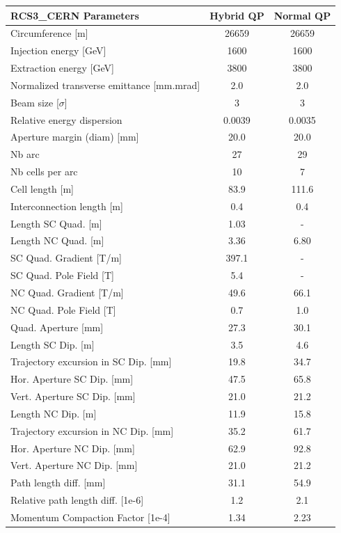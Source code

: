 \begin{tabular}{lcc}
\toprule
RCS3_CERN Parameters & Hybrid QP & Normal QP \\
\midrule
Circumference [m] & 26659 & 26659 \\
Injection energy [GeV] & 1600 & 1600 \\
Extraction energy [GeV] & 3800 & 3800 \\
Normalized transverse emittance [mm.mrad] & 2.0 & 2.0 \\
Beam size [$\sigma$] & 3 & 3 \\
Relative energy dispersion & 0.0039 & 0.0035 \\
Aperture margin (diam) [mm] & 20.0 & 20.0 \\
Nb arc & 27 & 29 \\
Nb cells per arc & 10 & 7 \\
Cell length [m] & 83.9 & 111.6 \\
Interconnection length [m] & 0.4 & 0.4 \\
Length SC Quad. [m] & 1.03 & - \\
Length NC Quad. [m] & 3.36 & 6.80 \\
SC Quad. Gradient [T/m] & 397.1 & - \\
SC Quad. Pole Field [T] & 5.4 & - \\
NC Quad. Gradient [T/m] & 49.6 & 66.1 \\
NC Quad. Pole Field [T] & 0.7 & 1.0 \\
Quad. Aperture [mm] & 27.3 & 30.1 \\
Length SC Dip. [m] & 3.5 & 4.6 \\
Trajectory excursion in SC Dip. [mm] & 19.8 & 34.7 \\
Hor. Aperture SC Dip. [mm] & 47.5 & 65.8 \\
Vert. Aperture SC Dip. [mm] & 21.0 & 21.2 \\
Length NC Dip. [m] & 11.9 & 15.8 \\
Trajectory excursion in NC Dip. [mm] & 35.2 & 61.7 \\
Hor. Aperture NC Dip. [mm] & 62.9 & 92.8 \\
Vert. Aperture NC Dip. [mm] & 21.0 & 21.2 \\
Path length diff. [mm] & 31.1 & 54.9 \\
Relative path length diff. [1e-6] & 1.2 & 2.1 \\
Momentum Compaction Factor [1e-4] & 1.34 & 2.23 \\
\bottomrule
\end{tabular}

